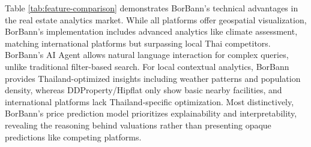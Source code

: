 \begin{table}[htbp]
\centering
\renewcommand{\arraystretch}{1.3}
\caption{Feature Comparison: BorBann vs Other Platforms}
\label{tab:feature-comparison}
\end{table}

Table \ref{tab:feature-comparison} demonstrates BorBann's technical advantages in the real estate analytics market. While all platforms offer geospatial visualization,
 BorBann's implementation includes advanced analytics like climate assessment, matching international platforms but surpassing local Thai competitors.
  BorBann's AI Agent allows natural language interaction for complex queries, unlike traditional filter-based search.
   For local contextual analytics, BorBann provides Thailand-optimized insights including weather patterns and population density,
    whereas DDProperty/Hipflat only show basic nearby facilities, and international platforms lack Thailand-specific optimization.
     Most distinctively, BorBann's price prediction model prioritizes explainability and interpretability,
      revealing the reasoning behind valuations rather than presenting opaque predictions like competing platforms.


